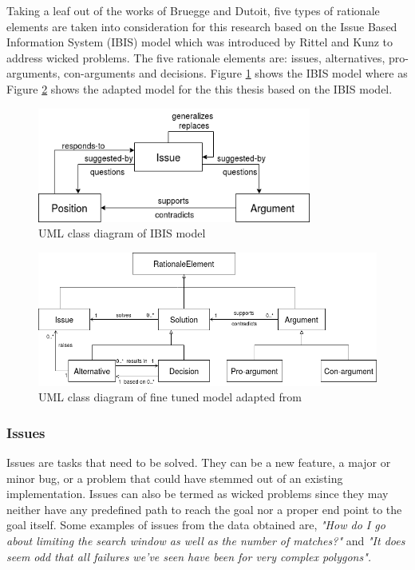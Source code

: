 \documentclass[a4paper,12pt,twoside]{report}
\begin{document}
\newline \newline
Taking a leaf out of the works of Bruegge and Dutoit\cite{Bruegge2009}, five types of rationale elements are taken into consideration for this research based on the Issue Based Information System (IBIS) model which was introduced by Rittel and Kunz \cite{Kunz1970} to address wicked problems. The five rationale elements are: issues, alternatives, pro-arguments, con-arguments and decisions. Figure \ref{fig:ibisModel} shows the IBIS model where as Figure \ref{fig:thesisClassModel} shows the adapted model for the this thesis based on the IBIS model. 
\begin{figure}[h] %
    \centering
    \includegraphics[width=9cm]{ibis-model}
    \caption{UML class diagram of IBIS model \cite{Kunz1970}}
    \label{fig:ibisModel}
\end{figure}

\begin{figure}[h] %
    \centering
    \includegraphics[width=12cm]{thesis-class-diagram}
    \caption{UML class diagram of fine tuned model adapted from \cite{Kunz1970}}
    \label{fig:thesisClassModel}
\end{figure}

 
\subsubsection{Issues}
Issues are tasks that need to be solved. They can be a new feature, a major or minor bug, or a problem that could have stemmed out of an existing implementation. Issues can also be termed as wicked problems \cite{Rittel1973} since they may neither have any predefined path to reach the goal nor a proper end point to the goal itself. Some examples of issues from the data obtained are, \textit{"How do I go about limiting the search window as well as the number of matches?"} and \textit{"It does seem odd that all failures we've seen have been for very complex polygons".}  
\end{document}
